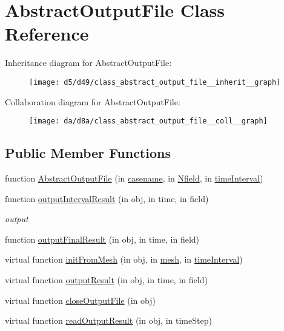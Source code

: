 \hypertarget{class_abstract_output_file}{}\section{Abstract\+Output\+File Class Reference}
\label{class_abstract_output_file}


Inheritance diagram for Abstract\+Output\+File\+:
\nopagebreak
\begin{figure}[H]
\begin{center}
\leavevmode
\texttt{[image: d5/d49/class\_abstract\_output\_file\_\_inherit\_\_graph]}
\end{center}
\end{figure}


Collaboration diagram for Abstract\+Output\+File\+:
\nopagebreak
\begin{figure}[H]
\begin{center}
\leavevmode
\texttt{[image: da/d8a/class\_abstract\_output\_file\_\_coll\_\_graph]}
\end{center}
\end{figure}
\subsection*{Public Member Functions}
\begin{DoxyCompactItemize}
\item 
function \hyperlink{class_abstract_output_file_a53079560599495e8a547e26df9b559e9}{Abstract\+Output\+File} (in \hyperlink{class_abstract_output_file_a84df82b3a07c6e5eb1f92f21a74fa1e4}{casename}, in \hyperlink{class_abstract_output_file_afdf632429d019dff27d7f29102512101}{Nfield}, in \hyperlink{class_abstract_output_file_a63b966920ed3d92aa7c6224628567623}{time\+Interval})
\item 
function \hyperlink{class_abstract_output_file_a954d54d5ceecf4e6c88437c0cd100802}{output\+Interval\+Result} (in obj, in time, in field)
\begin{DoxyCompactList}\small\item\em output \end{DoxyCompactList}\item 
function \hyperlink{class_abstract_output_file_aa8c6075b71d62460655ca5c9ed05ff52}{output\+Final\+Result} (in obj, in time, in field)
\item 
virtual function \hyperlink{class_abstract_output_file_aa0b287cfb6668b66ccb34fedcae38ea3}{init\+From\+Mesh} (in obj, in \hyperlink{class_abstract_output_file_a499c10c99f2eece91673bc8b8d1d1e99}{mesh}, in \hyperlink{class_abstract_output_file_a63b966920ed3d92aa7c6224628567623}{time\+Interval})
\item 
virtual function \hyperlink{class_abstract_output_file_a0dec489c86ddd06f361a668f32a6c362}{output\+Result} (in obj, in time, in field)
\item 
virtual function \hyperlink{class_abstract_output_file_a2e96b31ddf79e2b6478226d2554a388d}{close\+Output\+File} (in obj)
\item 
virtual function \hyperlink{class_abstract_output_file_af9ce12ac6966549b361e9e5fac443697}{read\+Output\+Result} (in obj, in time\+Step)
\end{DoxyCompactItemize}
